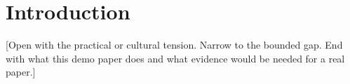 \section{Introduction}

[Open with the practical or cultural tension. Narrow to the bounded gap. End with what this demo paper does and what evidence would be needed for a real paper.]
